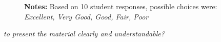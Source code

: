\begin{boenumerate}
\begin{itemize}
\begin{figure}[h!]\centering
{}\hspace{0.5cm}
\begin{center}
\begin{minipage}[t]{0.85\columnwidth}\vspace{-0.75cm}
\item\scriptsize{\textbf{Notes:} Based on 10 student responses, possible choices were: \emph{Excellent, Very Good, Good, Fair, Poor} }
\end{minipage}
\end{center}
\end{figure}
\FloatBarrier
\item \textit{to present the material clearly and understandable?}


\end{itemize}
\end{boenumerate}
